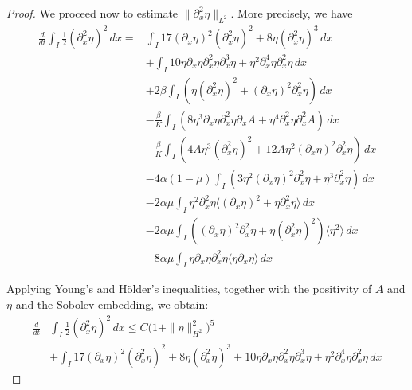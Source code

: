 \documentclass[12pt]{amsart}
\newcommand{\D}{\,d}
\begin{document}
\begin{proof}
	We  proceed now to estimate $\|\partial^2_x\eta\|_{L^2}$. More precisely, we have
	\begin{align*}
		\frac{d}{dt} \int_I\frac{1}{2}(\partial^2_x\eta)^2 \D x=&\int_I 17(\partial_x \eta)^2(\partial_x^2\eta)^2+8\eta(\partial_x^2\eta)^3\D x\\
        &+\int_I 10\eta\partial_x\eta\partial^2_x\eta\partial_x^3\eta+\eta^2\partial_x^4\eta\partial^2_x\eta\D x\\
		&+2\beta\int_I(\eta(\partial^2_x\eta)^2+(\partial_x\eta)^2\partial^2_x\eta)\D x\\
		&-\frac{\beta}{K}\int_I (8\eta^3\partial_x\eta\partial^2_x\eta\partial_xA+\eta^4\partial^2_x\eta\partial^2_xA)\D x\\
		&-\frac{\beta}{K}\int_I (4A\eta^3(\partial^2_x\eta)^2+12A\eta^2(\partial_x\eta)^2\partial^2_x\eta)\D x\\
		&-4\alpha(1-\mu)\int_I (3\eta^2(\partial_x\eta)^2\partial^2_x\eta+\eta^3\partial^2_x\eta)\D x\\
		&-2\alpha\mu\int_I\eta^2\partial^2_x\eta\langle(\partial_x\eta)^2+\eta\partial^2_x\eta\rangle\D x\\
		&-2\alpha\mu\int_I((\partial_x\eta)^2\partial^2_x\eta+\eta(\partial^2_x\eta)^2)\langle \eta^2 \rangle\D x\\
		&-8\alpha\mu\int_I\eta\partial_x\eta\partial^2_x\eta\langle\eta\partial_x\eta\rangle\D x
	\end{align*}

    

    Applying Young’s and Hölder’s inequalities, together with the positivity of $A$ and $\eta$ and the Sobolev embedding, we obtain:
	\begin{align*}
		\frac{d}{dt}& \int_I\frac{1}{2}(\partial^2_x\eta)^2 \D x \leq C \Big( 1 + \|\eta\|^2_{H^2}\Big)^5 \\
		&+\int_I 17(\partial_x \eta)^2(\partial_x^2\eta)^2+8\eta(\partial_x^2\eta)^3+10\eta\partial_x\eta\partial^2_x\eta\partial_x^3\eta+\eta^2\partial_x^4\eta\partial^2_x\eta\D x
\end{align*}
        

	
    

\end{proof}
\end{document}
